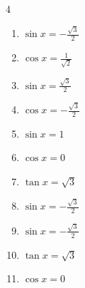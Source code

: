 \begin{multicols}{4}
\begin{enumerate}
  \item $\displaystyle \sin{x}  = -\frac{\sqrt{3}}{2}$


  \item $\displaystyle \cos{x}  = \frac{1}{\sqrt{2}}$


  \item $\displaystyle \sin{x}  = \frac{\sqrt{3}}{2}$


  \item $\displaystyle \cos{x}  = -\frac{\sqrt{3}}{2}$


  \item $\displaystyle \sin{x}  = 1$


  \item $\displaystyle \cos{x}  = 0$


  \item $\displaystyle \tan{x}  = \sqrt{3}$


\columnbreak %

  \item $\displaystyle \sin{x}  = -\frac{\sqrt{3}}{2}$


  \item $\displaystyle \sin{x}  = -\frac{\sqrt{3}}{2}$


  \item $\displaystyle \tan{x}  = \sqrt{3}$


  \item $\displaystyle \cos{x}  = 0$



\end{enumerate}
\end{multicols}
